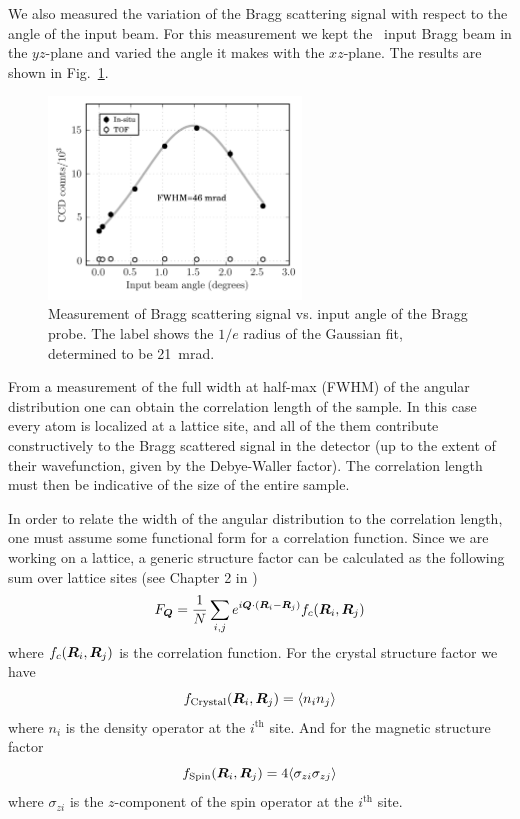 We also measured the variation of the Bragg scattering signal with respect to
the angle of the input beam.  For this measurement we kept the \zoz\ input
Bragg beam in the $yz$-plane and varied the angle it makes with the $xz$-plane.
The results are shown in Fig.~\ref{fig:100rocking}. 
\begin{figure}
    \centering
\includegraphics[width=0.6\textwidth]{../figures/braggscatt/rockingNice3.png}
\caption{\small  Measurement of Bragg scattering signal vs. input angle of the
Bragg probe. The label shows the $1/e$ radius of the Gaussian
fit, determined to be 21~mrad.  }
\label{fig:100rocking}
\end{figure}
From a measurement of the full width at half-max (FWHM) of the angular
distribution one can obtain the correlation length of the sample.   In this
case every atom is localized at a lattice site, and all of the them contribute
constructively to the Bragg scattered signal in the detector (up to the extent
of their wavefunction, given by the Debye-Waller factor).  The correlation
length must then be indicative of the size of the entire sample.   

In order to relate the width of the angular distribution to the correlation
length, one must assume some functional form for a correlation function.  Since
we are working on a lattice, a generic structure factor can be calculated as
the following sum over lattice sites (see Chapter 2 in
\cite{chaikin2000principles})
\begin{equation}
  F_{\bm{Q}} =  \frac{1}{N} \sum_{i,j} 
  e^{i\bm{Q} \cdot (\bm{R}_{i} - \bm{R}_{j}) }
    f_{c}(\bm{R}_{i},\bm{R}_{j} )
\end{equation}
where $f_{c}(\bm{R}_{i},\bm{R}_{j} )$ is the correlation function.  For the
crystal structure factor we have  
\begin{equation}
 f_{\text{Crystal}}(\bm{R}_{i},\bm{R}_{j} ) =   \langle n_{i} n_{j} \rangle 
\end{equation}
where $n_{i}$ is the density operator at the $i^{\text{th}}$ site.  And for the
magnetic structure factor  
\begin{equation}
 f_{\text{Spin}}(\bm{R}_{i},\bm{R}_{j}) =  
     4 \langle \sigma_{zi} \sigma_{zj} \rangle 
\end{equation}
where $\sigma_{zi}$ is the $z$-component of the spin operator at the
$i^{\text{th}}$ site.



